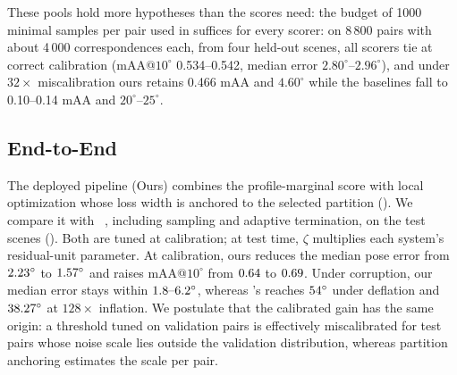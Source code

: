 These pools hold more hypotheses than the scores need: the budget of 1000
minimal samples per pair used in  suffices for every
scorer: on 8\,800 \phototourism pairs with about
4\,000 \rootsift correspondences each, from four held-out scenes, all scorers tie at correct calibration
(mAA@$10^\circ$ 0.534--0.542, median error $2.80^\circ$--$2.96^\circ$),
and under $32\times$ miscalibration ours retains 0.466 mAA and
$4.60^\circ$ while the baselines fall to 0.10--0.14 mAA and
$20^\circ$--$25^\circ$.


\subsection{End-to-End \ransac}
\label{sec:supp-deploy-e2e}

The deployed pipeline (Ours) combines the profile-marginal score with
local optimization whose loss width is anchored to the selected partition
(). We compare it with
\superansac~\cite{Barath2025superansac}, including sampling and adaptive
termination, on the \PTTestScenes{} \phototourism test scenes
(). Both are tuned at calibration; at test time, $\zeta$
multiplies each system's residual-unit parameter. At calibration, ours
reduces the median pose error from $2.23^\circ$ to
$1.57^\circ$ and raises mAA@$10^\circ$ from $0.64$ to
$0.69$. Under corruption, our median error stays within
$1.8\text{--}6.2^\circ$, whereas \superansac's reaches $54^\circ$
under deflation and $38.27^\circ$ at $128\times$ inflation. We %
postulate that the calibrated gain has the same origin: a threshold tuned
on validation pairs is effectively miscalibrated for test pairs whose noise
scale lies outside the validation distribution, whereas partition anchoring
estimates the scale per pair.

\begin{table}[ht]
	\centering
	\small
	\setlength{\tabcolsep}{4pt}
	\caption{\textbf{RANSAC under scale miscalibration.}
		Scene-averaged median pose error and mAA@$10^\circ$ on the
		\PTTestScenes{} \phototourism test scenes; median wall time per pair,
		single-threaded, on a stratified sample of \EtoETimePairs{} pairs per
		scene (median of \EtoETimeRepeats{} repeats); both systems tuned at
		$\zeta=1$, \superansac at its validated maximum noise level with at
		most $10\,000$ trials. Bold marks the better system per column.}
	\label{tab:e2e}
	
\end{table}

